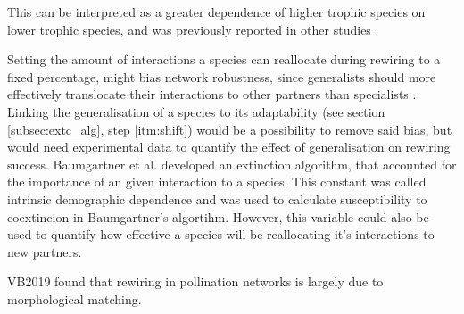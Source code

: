 \documentclass[12pt,a4paper]{article}
\begin{document}

 This can be interpreted as a greater dependence of higher trophic species on lower trophic species, and was previously reported in other studies \parencite{Bascompte2006, Schleuning2016}.



%
Setting the amount of interactions a species can reallocate during rewiring to a fixed percentage, might bias network robustness, since generalists should more effectively translocate their interactions to other partners than specialists \parencite{Ramos-Jiliberto2012}. Linking the generalisation of a species to its adaptability (see section \ref{subsec:extc_alg}, step \ref{itm:shift}) would be a possibility to remove said bias, but would need experimental data to quantify the effect of generalisation on rewiring success. Baumgartner et al. \parencite{Baumgartner2020} developed an extinction algorithm, that accounted for the importance of an given interaction to a species. This constant was called intrinsic demographic dependence and was used to calculate susceptibility to coextincion in Baumgartner's algortihm. However, this variable could also be used to quantify how effective a species will be reallocating it's interactions to new partners.

VB2019 found that rewiring in pollination networks is largely due to morphological matching. 


\end{document}
